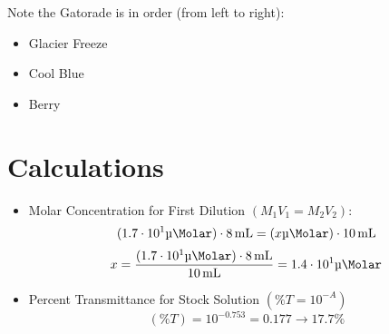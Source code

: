 \documentclass{article}
\begin{document}
        Note the Gatorade is in order (from left to right):
        \begin{itemize}
            \item Glacier Freeze
            \item Cool Blue
            \item Berry
        \end{itemize}

    \section{Calculations}
        \begin{itemize}
            \item Molar Concentration for First Dilution \((M_{1}V_{1} = M_{2}V_{2})\): \\
            \[(1.7\cdot10^{1}\si{\micro\Molar})\cdot\SI{8}{\ml} = (x\si{\micro\Molar})\cdot\SI{10}{\ml}\]
            \[x = \frac{(1.7\cdot10^{1}\si{\micro\Molar})\cdot\SI{8}{\ml}}{\SI{10}{\ml}} = 1.4\cdot10^{1}\si{\micro\Molar}\]
            \item Percent Transmittance for Stock Solution \((\%T = 10^{-A})\) \\
            \[(\%T) = 10^{-0.753} = 0.177\to17.7\%\]
        \end{itemize}
\end{document}
